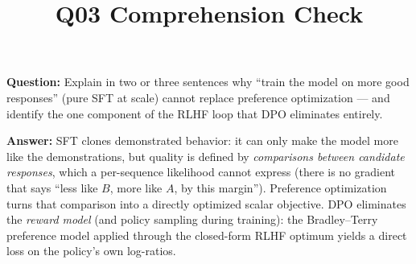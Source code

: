 \documentclass[11pt]{article}
\title{Q03 Comprehension Check}
\date{}
\begin{document}
\maketitle
\textbf{Question:} Explain in two or three sentences why ``train the model on more good responses'' (pure SFT at scale) cannot replace preference optimization --- and identify the one component of the RLHF loop that DPO eliminates entirely.

\vspace{1em}
\textbf{Answer:} SFT clones demonstrated behavior: it can only make the model more like the demonstrations, but quality is defined by \emph{comparisons between candidate responses}, which a per-sequence likelihood cannot express (there is no gradient that says ``less like $B$, more like $A$, by this margin''). Preference optimization turns that comparison into a directly optimized scalar objective. DPO eliminates the \emph{reward model} (and policy sampling during training): the Bradley--Terry preference model applied through the closed-form RLHF optimum yields a direct loss on the policy's own log-ratios.
\end{document}
